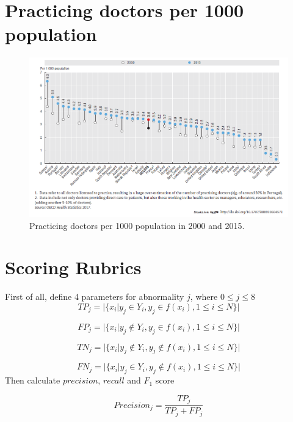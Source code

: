 \documentclass[%
 reprint,
 amsmath,amssymb,
 aps,
]{revtex4-2}
\begin{document}
\appendix

\section{Practicing doctors per 1000 population}

\begin{figure}[H]
	\includegraphics[width=\linewidth]{img/doc_per_1000.png}
	\caption{\label{fig:doc_per_1000} Practicing doctors per 1000 population in 2000 and 2015. \cite{OECD}}
\end{figure}

\section{Scoring Rubrics}
First of all, define 4 parameters for abnormality $j$, where $0 \leq j \leq 8$
\begin{equation}
TP_j = |\{x_i|y_j \in Y_i, y_j \in f(x_i), 1 \leq i \leq N\}|
\end{equation}

\begin{equation}
FP_j = |\{x_i|y_j \notin Y_i, y_j \in f(x_i), 1 \leq i \leq N\}|
\end{equation}

\begin{equation}
TN_j = |\{x_i|y_j \notin Y_i, y_j \notin f(x_i), 1 \leq i \leq N\}|
\end{equation}

\begin{equation}
FN_j = |\{x_i|y_j \in Y_i, y_j \notin f(x_i), 1 \leq i \leq N\}|
\end{equation}
Then calculate $precision$, $recall$ and $F_1$ score

\begin{equation}
Precision_j = \frac{TP_j}{TP_j + FP_j}
\end{equation}
\end{document}
